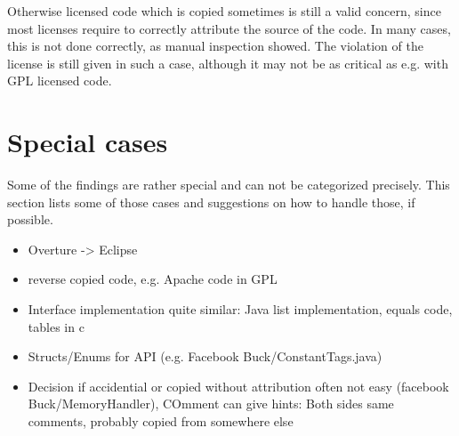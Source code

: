 Otherwise licensed code which is copied sometimes is still a valid concern, since most licenses require to correctly attribute the source of the code.
In many cases, this is not done correctly, as manual inspection showed.
The violation of the license is still given in such a case, although it may not be as critical as e.g. with GPL licensed code.






\section{Special cases}
Some of the findings are rather special and can not be categorized precisely.
This section lists some of those cases and suggestions on how to handle those, if possible.

\begin{itemize}
	\item Overture -> Eclipse
	\item reverse copied code, e.g. Apache code in GPL
	\item Interface implementation quite similar: Java list implementation, equals code, tables in c
	\item Structs/Enums for API (e.g. Facebook Buck/ConstantTags.java)
	\item Decision if accidential or copied without attribution often not easy (facebook Buck/MemoryHandler), COmment can give hints: Both sides same comments, probably copied from somewhere else
\end{itemize}


